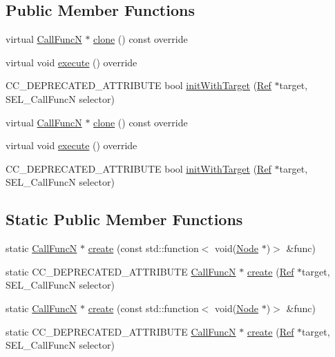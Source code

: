 \subsection*{Public Member Functions}
\begin{DoxyCompactItemize}
\item 
virtual \hyperlink{classCallFuncN}{Call\+FuncN} $\ast$ \hyperlink{classCallFuncN_a0284c35f23aa8b68bc921eb044b6dd54}{clone} () const override
\item 
virtual void \hyperlink{classCallFuncN_af75fea048afe561409f3d8b156eb1a12}{execute} () override
\item 
C\+C\+\_\+\+D\+E\+P\+R\+E\+C\+A\+T\+E\+D\+\_\+\+A\+T\+T\+R\+I\+B\+U\+TE bool \hyperlink{classCallFuncN_a6f2f7343dc7aa74035dbf89c45a4e2f3}{init\+With\+Target} (\hyperlink{classRef}{Ref} $\ast$target, S\+E\+L\+\_\+\+Call\+FuncN selector)
\item 
virtual \hyperlink{classCallFuncN}{Call\+FuncN} $\ast$ \hyperlink{classCallFuncN_aad41687c463cb5d6e9a5879b0dd8b1e3}{clone} () const override
\item 
virtual void \hyperlink{classCallFuncN_a072d0dabb4a2d7d211d164fedd79c47a}{execute} () override
\item 
C\+C\+\_\+\+D\+E\+P\+R\+E\+C\+A\+T\+E\+D\+\_\+\+A\+T\+T\+R\+I\+B\+U\+TE bool \hyperlink{classCallFuncN_ae850468e8908d4a5026b1112106c8ca4}{init\+With\+Target} (\hyperlink{classRef}{Ref} $\ast$target, S\+E\+L\+\_\+\+Call\+FuncN selector)
\end{DoxyCompactItemize}
\subsection*{Static Public Member Functions}
\begin{DoxyCompactItemize}
\item 
static \hyperlink{classCallFuncN}{Call\+FuncN} $\ast$ \hyperlink{classCallFuncN_a50867d17b83343d084eff6fd5b5670d9}{create} (const std\+::function$<$ void(\hyperlink{classNode}{Node} $\ast$)$>$ \&func)
\item 
static C\+C\+\_\+\+D\+E\+P\+R\+E\+C\+A\+T\+E\+D\+\_\+\+A\+T\+T\+R\+I\+B\+U\+TE \hyperlink{classCallFuncN}{Call\+FuncN} $\ast$ \hyperlink{classCallFuncN_a12371cadea736eca54cef676dbe9dab9}{create} (\hyperlink{classRef}{Ref} $\ast$target, S\+E\+L\+\_\+\+Call\+FuncN selector)
\item 
static \hyperlink{classCallFuncN}{Call\+FuncN} $\ast$ \hyperlink{classCallFuncN_a7e5d2829154cd6eb68c3e011882bc62d}{create} (const std\+::function$<$ void(\hyperlink{classNode}{Node} $\ast$)$>$ \&func)
\item 
static C\+C\+\_\+\+D\+E\+P\+R\+E\+C\+A\+T\+E\+D\+\_\+\+A\+T\+T\+R\+I\+B\+U\+TE \hyperlink{classCallFuncN}{Call\+FuncN} $\ast$ \hyperlink{classCallFuncN_a3d856e09f0544e717ac9ebf46daa77ed}{create} (\hyperlink{classRef}{Ref} $\ast$target, S\+E\+L\+\_\+\+Call\+FuncN selector)
\end{DoxyCompactItemize}
